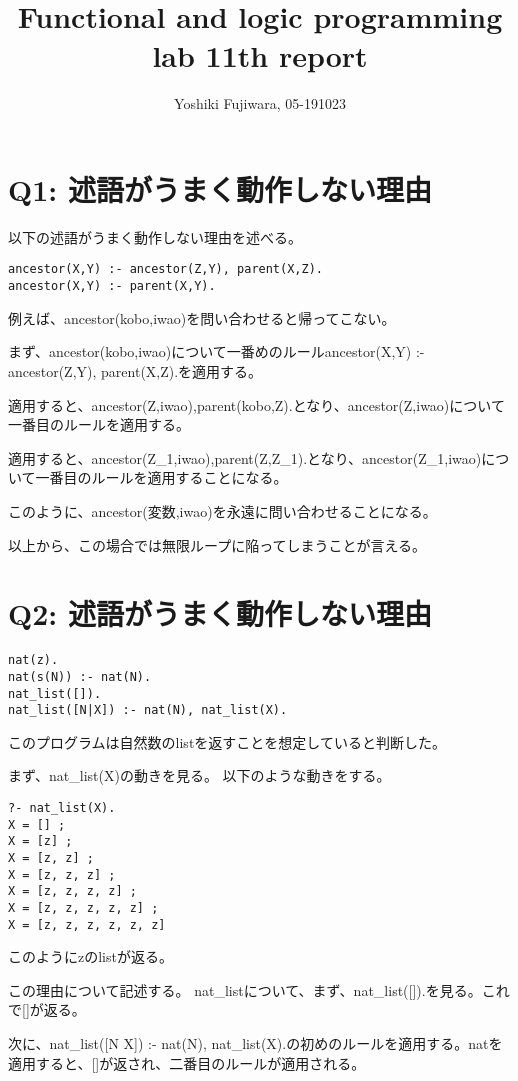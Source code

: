 \documentclass[uplatex,12pt]{jsarticle}
\title {Functional and logic programming lab 11th report}
\date{}
\begin{document}
\author{Yoshiki Fujiwara, 05-191023}
\maketitle

\section{Q1: 述語がうまく動作しない理由}
以下の述語がうまく動作しない理由を述べる。
\begin{lstlisting}[caption=動作例]
ancestor(X,Y) :- ancestor(Z,Y), parent(X,Z).
ancestor(X,Y) :- parent(X,Y).
\end{lstlisting}

例えば、ancestor(kobo,iwao)を問い合わせると帰ってこない。

まず、ancestor(kobo,iwao)について一番めのルールancestor(X,Y) :- ancestor(Z,Y), parent(X,Z).を適用する。

適用すると、ancestor(Z,iwao),parent(kobo,Z).となり、ancestor(Z,iwao)について一番目のルールを適用する。

適用すると、ancestor(Z_1,iwao),parent(Z,Z_1).となり、ancestor(Z_1,iwao)について一番目のルールを適用することになる。

このように、ancestor(変数,iwao)を永遠に問い合わせることになる。

以上から、この場合では無限ループに陥ってしまうことが言える。

\section{Q2: 述語がうまく動作しない理由}
\begin{lstlisting}[caption=動作例]
nat(z).
nat(s(N)) :- nat(N).
nat_list([]).
nat_list([N|X]) :- nat(N), nat_list(X).
\end{lstlisting}

このプログラムは自然数のlistを返すことを想定していると判断した。

まず、nat\_list(X)の動きを見る。
以下のような動きをする。
\begin{lstlisting}[caption=動作例]
?- nat_list(X).
X = [] ;
X = [z] ;
X = [z, z] ;
X = [z, z, z] ;
X = [z, z, z, z] ;
X = [z, z, z, z, z] ;
X = [z, z, z, z, z, z]
\end{lstlisting}
このようにzのlistが返る。

この理由について記述する。
nat\_listについて、まず、nat\_list([]).を見る。これで[]が返る。

次に、nat\_list([N \mid X]) :- nat(N), nat\_list(X).の初めのルールを適用する。natを適用すると、[]が返され、二番目のルールが適用される。
\end{document}
